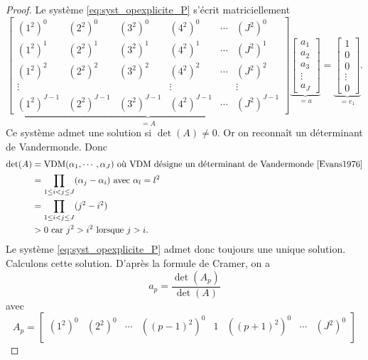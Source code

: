 \begin{proof}
Le système \eqref{eq:syst_opexplicite_P} s'écrit matriciellement
\begin{equation}
\underbrace{\begin{bmatrix}
(1^2)^0 & (2^2)^0 & (3^2)^0 & (4^2)^0 & \cdots & (J^2)^0\\
(1^2)^1 & (2^2)^1 & (3^2)^1 & (4^2)^1 & \cdots & (J^2)^1\\
(1^2)^2 & (2^2)^2 & (3^2)^2 & (4^2)^2 & \cdots & (J^2)^2\\
\vdots  &         &         & \vdots  &        &  \vdots\\
(1^2)^{J-1} & (2^2)^{J-1} & (3^2)^{J-1} & (4^2)^{J-1} & \cdots & (J^2)^{J-1}
\end{bmatrix}}_{= A}
\underbrace{\begin{bmatrix}
a_1 \\ a_2 \\ a_3 \\ \vdots \\ a_J
\end{bmatrix}
}_{=a} = \underbrace{\begin{bmatrix}
1 \\ 0 \\ 0 \\ \vdots \\ 0
\end{bmatrix}
}_{= e_1}.
\end{equation}
Ce système admet une solution si $\det (A) \neq 0$. Or on reconnaît un déterminant de Vandermonde. Donc
\begin{align*}
\det (A) & = \text{VDM}(\alpha_1 , \cdots, \alpha_J) \text{ où } \text{VDM} \text{ désigne un déterminant de Vandermonde \cite{Evans1976}} \\
	& = \displaystyle\prod\limits_{1\leq i < j \leq J} (\alpha_j - \alpha_i) \text{ avec } \alpha_l = l^2 \\
	& = \displaystyle\prod\limits_{1\leq i < j \leq J} (j^2 - i^2)\\
	& > 0 \text{ car } j^2 > i^2 \text{ lorsque } j>i.
\end{align*}
Le système \eqref{eq:syst_opexplicite_P} admet donc toujours une unique solution. Calculons cette solution. D'après la formule de Cramer, on a 
\begin{equation}
a_p = \dfrac{\det (A_p)}{\det (A)}
\end{equation}
avec
\begin{equation}
A_p = \begin{bmatrix}
(1^2)^0 & (2^2)^0 & \cdots & ((p-1)^2)^0 & 1 & ((p+1)^2)^0 & \cdots & (J^2)^0 \\ 

\end{bmatrix}
\end{equation}
\end{proof}
